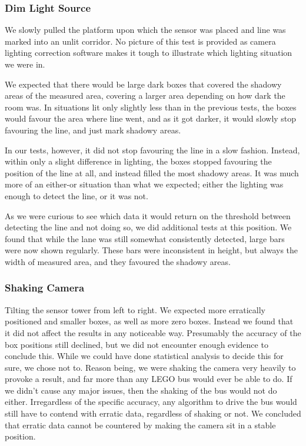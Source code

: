 \subsubsection{Dim Light Source}
We slowly pulled the platform upon which the sensor was placed and line was marked into an unlit corridor. No picture of this test is provided as camera lighting correction software makes it tough to illustrate which lighting situation we were in. 

We expected that there would be large dark boxes that covered the shadowy areas of the measured area, covering a larger area depending on how dark the room was. In situations lit only slightly less than in the previous tests, the boxes would favour the area where line went, and as it got darker, it would slowly stop favouring the line, and just mark shadowy areas.

In our tests, however, it did not stop favouring the line in a slow fashion. Instead, within only a slight difference in lighting, the boxes stopped favouring the position of the line at all, and instead filled the most shadowy areas. It was much more of an either-or situation than what we expected; either the lighting was enough to detect the line, or it was not. 

As we were curious to see which data it would return on the threshold between detecting the line and not doing so, we did additional tests at this position. We found that while the lane was still somewhat consistently detected, large bars were now shown regularly. These bars were inconsistent in height, but always the width of measured area, and they favoured the shadowy areas. 

\todo{}



\subsubsection{Shaking Camera}
Tilting the sensor tower from left to right. 
We expected more erratically positioned and smaller boxes, as well as more zero boxes.
Instead we found that it did not affect the results in any noticeable way. Presumably the accuracy of the box positions still declined, but we did not encounter enough evidence to conclude this. While we could have done statistical analysis to decide this for sure, we chose not to. 
Reason being, we were shaking the camera very heavily to provoke a result, and far more than any LEGO bus would ever be able to do. If we didn't cause any major issues, then the shaking of the bus would not do either. Irregardless of the specific accuracy, any algorithm to drive the bus would still have to contend with erratic data, regardless of shaking or not. We concluded that erratic data cannot be countered by making the camera sit in a stable position.

